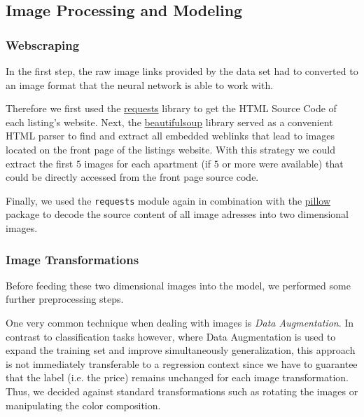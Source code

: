 \documentclass[12pt, letterpaper]{article}
\begin{document}
\begin{appendices}
    \section{}
    \subsection{Image Processing and Modeling} \label{appendix:images}

    \subsubsection{Webscraping}

    In the first step, the raw image links provided by the data set had to converted to an image format that the neural network is able to work with.

    Therefore we first used the \href{https://docs.python-requests.org/en/latest/}{requests} library to get the HTML Source Code of each listing's website.
    Next, the \href{https://beautiful-soup-4.readthedocs.io/en/latest/}{beautifulsoup} library served as a convenient HTML parser to find and extract all embedded weblinks that lead to images located on the front page of the listings website.
    With this strategy we could extract the first $5$ images for each apartment (if $5$ or more were available) that could be directly accessed from the front page source code.

    Finally, we used the \texttt{requests} module again in combination with the \href{https://pillow.readthedocs.io/en/stable/}{pillow} package to decode the source content of all image adresses into two dimensional images.

    \subsubsection{Image Transformations}

    Before feeding these two dimensional images into the model, we performed some further preprocessing steps.

    One very common technique when dealing with images is \emph{Data Augmentation}.
    In contrast to classification tasks however, where Data Augmentation is used to expand the training set and improve simultaneously generalization, this approach is not immediately transferable to a regression context since we have to guarantee that the label (i.e. the price) remains unchanged for each image transformation.
    Thus, we decided against standard transformations such as rotating the images or manipulating the color composition.


\end{appendices}
\end{document}
